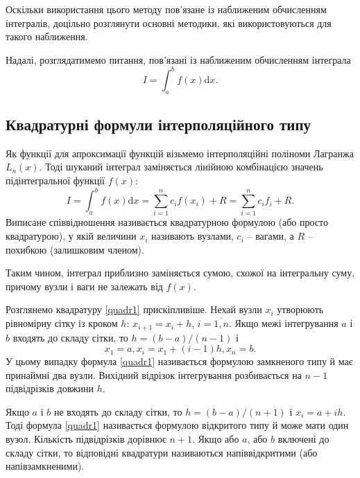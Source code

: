 \documentclass[14pt,twoside]{extreport}
\theoremstyle{mystyle}
\numberwithin{equation}{chapter}
\begin{document}
Оскільки використання цього методу пов'язане із наближеним обчисленням інтегралів, доцільно розглянути основні методики, які використовуються для такого наближення.

Надалі, розглядатимемо питання, пов'язані із наближеним обчисленням інтеграла
\[
I=\int_{a}^{b}f(x)\mathrm{d}x.
\]

\subsection{Квадратурні формули інтерполяційного типу}

Як функції для апроксимації функцій візьмемо інтерполяційні поліноми Лагранжа $L_n(x)$. Тоді шуканий інтеграл заміняється лінійною комбінацією значень підінтегральної функції $f(x)$:
\begin{equation}\label{quadr1}
I=\displaystyle \int_{a}^{b}f(x)\mathrm{d}x=\sum_{i=1}^{n}c_{i}f(x_{i})+R=\sum_{i=1}^{n}c_{i}f_{i}+R.
\end{equation}
Виписане співвідношення називається квадратурною формулою (або просто квадратурою), у якій величини $x_i$ називають вузлами, $c_i$ -- вагами, а $R$ -- похибкою (залишковим членом).

Таким чином, інтеграл приблизно заміняється сумою, схожої на інтегральну суму, причому вузли і ваги не залежать від $f(x)$.

Розглянемо квадратуру \eqref{quadr1} прискіпливіше. Нехай вузли $x_i$ утворюють рівномірну сітку із кроком $h$: $x_{i+1} = x_i + h$, $i=\overline{1,n}$. Якщо межі інтегрування $a$ і $b$ входять до складу сітки, то $h = (b - a)/(n - 1)$ і
\[
x_{1}=a, x_{i}=x_{1}+(i-1)h, x_{n}=b.
\]
У цьому випадку формула \eqref{quadr1} називається формулою замкненого типу й має принаймні два вузли. Вихідний відрізок інтегрування розбивається на $n-1$ підвідрізків довжини $h$.

Якщо $a$ і $b$ не входять до складу сітки, то $h = (b - a)/(n + 1)$ і $x_i = a+ih$. Тоді формула \eqref{quadr1} називається формулою відкритого типу й може мати один вузол. Кількість підвідрізків дорівнює $n + 1$. Якщо або $a$, або $b$ включені до складу сітки, то відповідні квадратури називаються напіввідкритими (або напівзамкненими).
\end{document}
